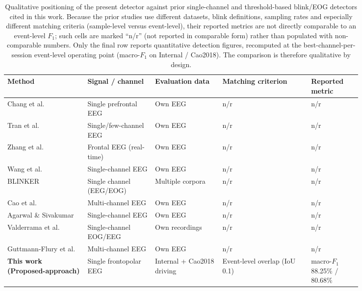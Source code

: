\begin{table}[H]
  \centering
  \caption{Qualitative positioning of the present detector against prior single-channel and threshold-based blink/EOG detectors cited in this work. Because the prior studies use different datasets, blink definitions, sampling rates and especially different matching criteria (sample-level versus event-level), their reported metrics are not directly comparable to an event-level $F_1$; such cells are marked ``n/r'' (not reported in comparable form) rather than populated with non-comparable numbers. Only the final row reports quantitative detection figures, recomputed at the best-channel-per-session event-level operating point (macro-$F_1$ on Internal / Cao2018). The comparison is therefore qualitative by design.}
  \label{tab:literature_comparison}
  \setlength{\tabcolsep}{4pt}
  \begin{tabular}{p{0.19\linewidth}p{0.16\linewidth}p{0.16\linewidth}p{0.21\linewidth}p{0.12\linewidth}}
    \toprule
    Method & Signal / channel & Evaluation data & Matching criterion & Reported metric \\
    \midrule
    Chang et al.~\citep{chang2016detection} & Single prefrontal EEG & Own EEG & n/r & n/r \\
    Tran et al.~\citep{tran2021detection} & Single/few-channel EEG & Own EEG & n/r & n/r \\
    Zhang et al.~\citep{zhang2023method} & Frontal EEG (real-time) & Own EEG & n/r & n/r \\
    Wang et al.~\citep{wang2025sliding} & Single-channel EEG & Own EEG & n/r & n/r \\
    BLINKER~\citep{kleifges2017blinker} & Single channel (EEG/EOG) & Multiple corpora & n/r & n/r \\
    Cao et al.~\citep{cao2021unsupervised} & Multi-channel EEG & Own EEG & n/r & n/r \\
    Agarwal \& Sivakumar~\citep{agarwal2019blink} & Single-channel EEG & Own EEG & n/r & n/r \\
    Valderrama et al.~\citep{valderrama2018automatic} & Single-channel EOG/EEG & Own recordings & n/r & n/r \\
    Guttmann-Flury et al.~\citep{guttmann2019new} & Multi-channel EEG & Own EEG & n/r & n/r \\
    \midrule
    \textbf{This work (Proposed-approach)} & Single frontopolar EEG & Internal + Cao2018 driving & Event-level overlap (IoU 0.1) & macro-$F_1$ 88.25\% / 80.68\% \\
    \bottomrule
  \end{tabular}
\end{table}
